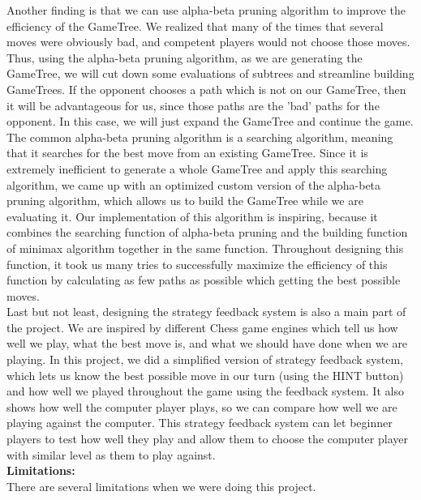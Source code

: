 \documentclass[fontsize=11pt]{article}
\begin{document}
Another finding is that we can use alpha-beta pruning algorithm to improve the efficiency of the GameTree. We realized that many of the times that several moves were obviously bad, and competent players would not choose those moves. Thus, using the alpha-beta pruning algorithm, as we are generating the GameTree, we will cut down some evaluations of subtrees and streamline building GameTrees. If the opponent chooses a path which is not on our GameTree, then it will be advantageous for us, since those paths are the 'bad' paths for the opponent. In this case, we will just expand the GameTree and continue the game. \\

The common alpha-beta pruning algorithm is a searching algorithm, meaning that it searches for the best move from an existing GameTree. Since it is extremely inefficient to generate a whole GameTree and apply this searching algorithm, we came up with an optimized custom version of the alpha-beta pruning algorithm, which allows us to build the GameTree while we are evaluating it. Our implementation of this algorithm is inspiring, because it combines the searching function of alpha-beta pruning and the building function of minimax algorithm together in the same function. Throughout designing this function, it took us many tries to successfully maximize the efficiency of this function by calculating as few paths as possible which getting the best possible moves. \\

Last but not least, designing the strategy feedback system is also a main part of the project. We are inspired by different Chess game engines which tell us how well we play, what the best move is, and what we should have done when we are playing. In this project, we did a simplified version of strategy feedback system, which lets us know the best possible move in our turn (using the HINT button) and how well we played throughout the game using the feedback system. It also shows how well the computer player plays, so we can compare how well we are playing against the computer. This strategy feedback system can let beginner players to test how well they play and allow them to choose the computer player with similar level as them to play against.\\

\textbf{Limitations:}\\

There are several limitations when we were doing this project.\\
\end{document}

